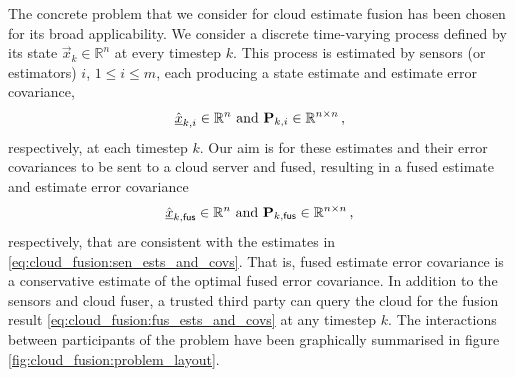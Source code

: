 The concrete problem that we consider for cloud estimate fusion has been chosen for its broad applicability. We consider a discrete time-varying process defined by its state $\vec{x}_k \in \mathbb{R}^n$ at every timestep $k$. This process is estimated by sensors (or estimators) $i$, $1\leq i\leq m$, each producing a state estimate and estimate error covariance,
\begin{equation}\label{eq:cloud_fusion:sen_ests_and_covs}
    \hat{{\underline{x}}}_{k,i} \in \mathbb{R}^n \text{ and } {\ensuremath{{\mathbf{P}}}}_{k,i} \in \mathbb{R}^{n\times n}\,,
\end{equation}
respectively, at each timestep $k$. Our aim is for these estimates and their error covariances to be sent to a cloud server and fused, resulting in a fused estimate and estimate error covariance
\begin{equation}\label{eq:cloud_fusion:fus_ests_and_covs}
    \hat{{\underline{x}}}_{k,\mathsf{fus}} \in \mathbb{R}^n \text{ and } {\ensuremath{{\mathbf{P}}}}_{k,\mathsf{fus}} \in \mathbb{R}^{n\times n}\,,
\end{equation}
respectively, that are consistent with the estimates in \eqref{eq:cloud_fusion:sen_ests_and_covs}. That is, fused estimate error covariance is a conservative estimate of the optimal fused error covariance. In addition to the sensors and cloud fuser, a trusted third party can query the cloud for the fusion result \eqref{eq:cloud_fusion:fus_ests_and_covs} at any timestep $k$. The interactions between participants of the problem have been graphically summarised in figure \ref{fig:cloud_fusion:problem_layout}.
